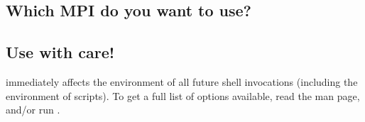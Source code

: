 %
%
%

\subsection{Which MPI do you want to use?}
\label{app:switcher-which-mpi-to-use}




\subsection{Use  with care!}

 immediately affects the environment of all future shell
invocations (including the environment of scripts).  To get a full
list of options available, read the  man page, and/or
run .
